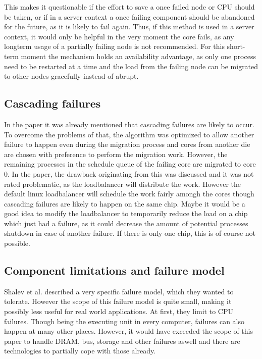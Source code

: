 \documentclass[a4paper,10pt,twoside]{article}
\begin{document}
This makes it questionable if the effort to save a once failed node or CPU should be taken, or if in a server context a once failing component should be abandoned for the future, as it is likely to fail again. Thus, if this method is used in a server context, it would only be helpful in the very moment the core fails, as any longterm usage of a partially failing node is not recommended. For this short-term moment the mechanism holds an availability advantage, as only one process need to be restarted at a time and the load from the failing node can be migrated to other nodes gracefully instead of abrupt.

\subsection{Cascading failures}
In the paper it was already mentioned that cascading failures are likely to occur. To overcome the problems of that, the algorithm was optimized to allow another failure to happen even during the migration process and cores from another die are chosen with preference to perform the migration work. However, the remaining processes in the schedule queue of the failing core are migrated to core 0. In the paper, the drawback originating from this was discussed and it was not rated problematic, as the loadbalancer will distribute the work. However the default linux loadbalancer will schedule the work fairly amongh the cores though cascading failures are likely to happen on the same chip. %
Maybe it would be a good idea to modify the loadbalancer to temporarily reduce the load on a chip which just had a failure, as it could decrease the amount of potential processes shutdown in case of another failure. If there is only one chip, this is of course not possible.

\subsection{Component limitations and failure model} \label{cachefailure}
Shalev et al. described a very specific failure model, which they wanted to tolerate. However the scope of this failure model is quite small, making it possibly less useful for real world applications. At first, they limit to CPU failures. Though being the executing unit in every computer, failures can also happen at many other places. However, it would have exceeded the scope of this paper to handle DRAM, bus, storage and other failures aswell and there are technologies to partially cope with those already.
\end{document}
